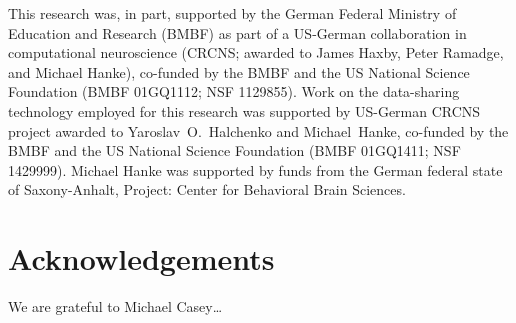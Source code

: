 This research was, in part, supported by the German Federal Ministry of
Education and Research (BMBF) as part of a US-German collaboration in
computational neuroscience (CRCNS; awarded to James Haxby, Peter Ramadge, and
Michael Hanke), co-funded by the BMBF and the US National Science Foundation
(BMBF 01GQ1112; NSF 1129855).  Work on the data-sharing technology employed for
this research was supported by US-German CRCNS project awarded to
Yaroslav~O.~Halchenko and Michael~Hanke, co-funded by the BMBF and the US
National Science Foundation (BMBF 01GQ1411; NSF 1429999).  Michael Hanke was
supported by funds from the German federal state of Saxony-Anhalt, Project:
Center for Behavioral Brain Sciences.


\section*{Acknowledgements}

We are grateful to Michael Casey\ldots





